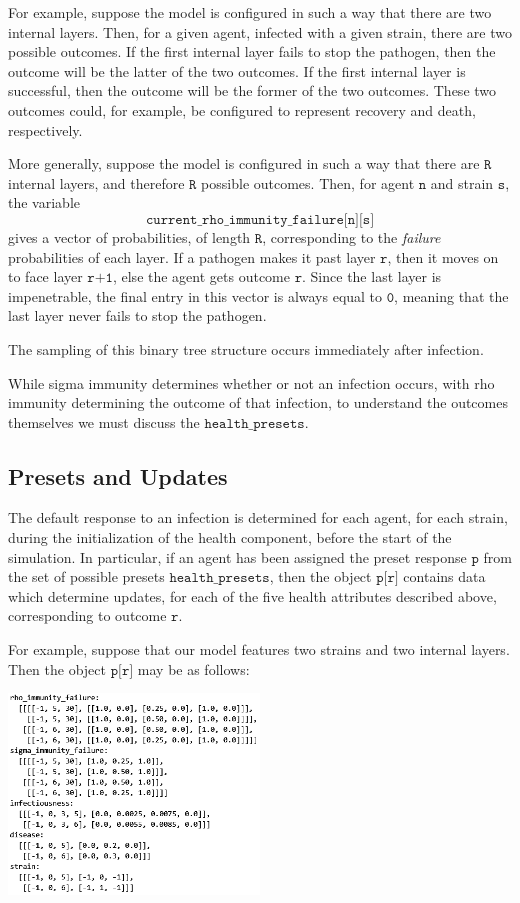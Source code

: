 \documentclass[10pt,letterpaper]{article}
\begin{document}
For example, suppose the model is configured in such a way that there are two internal layers. Then, for a given agent, infected with a given strain, there are two possible outcomes. If the first internal layer fails to stop the pathogen, then the outcome will be the latter of the two outcomes. If the first internal layer is successful, then the outcome will be the former of the two outcomes. These two outcomes could, for example, be configured to represent recovery and death, respectively.

More generally, suppose the model is configured in such a way that there are $\texttt{R}$ internal layers, and therefore $\texttt{R}$ possible outcomes. Then, for agent $\texttt{n}$ and strain $\texttt{s}$, the variable $$\texttt{current{\_}rho{\_}immunity{\_}failure[n][s]}$$ gives a vector of probabilities, of length $\texttt{R}$, corresponding to the \textit{failure} probabilities of each layer. If a pathogen makes it past layer $\texttt{r}$, then it moves on to face layer $\texttt{r+1}$, else the agent gets outcome $\texttt{r}$. Since the last layer is impenetrable, the final entry in this vector is always equal to $\texttt{0}$, meaning that the last layer never fails to stop the pathogen.

The sampling of this binary tree structure occurs immediately after infection.

While sigma immunity determines whether or not an infection occurs, with rho immunity determining the outcome of that infection, to understand the outcomes themselves we must discuss the $\texttt{health{\_}presets}$.

\subsection{Presets and Updates}

The default response to an infection is determined for each agent, for each strain, during the initialization of the health component, before the start of the simulation. In particular, if an agent has been assigned the preset response $\texttt{p}$ from the set of possible presets $\texttt{health{\_}presets}$, then the object $\texttt{p[r]}$ contains data which determine updates, for each of the five health attributes described above, corresponding to outcome $\texttt{r}$.

For example, suppose that our model features two strains and two internal layers. Then the object $\texttt{p[r]}$ may be as follows:
\begin{center}
\includegraphics[width=0.5\textwidth]{codeexamplebw}
\end{center}
\end{document}
